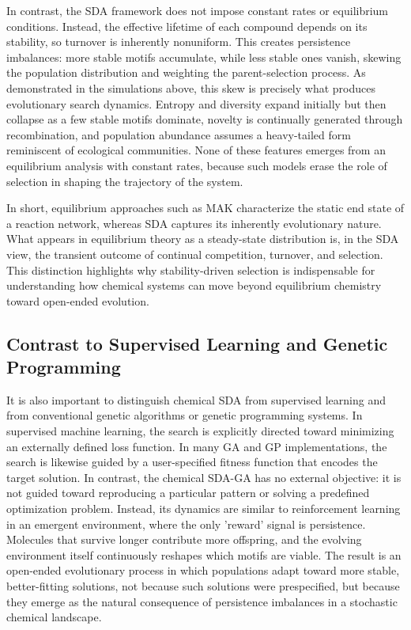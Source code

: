 \documentclass[life,article,submit,pdftex,moreauthors]{Definitions/mdpi}
\begin{document}
In contrast, the SDA framework does not impose constant rates or equilibrium conditions. Instead, the effective lifetime of each compound depends on its stability, so turnover is inherently nonuniform. This creates persistence imbalances: more stable motifs accumulate, while less stable ones vanish, skewing the population distribution and weighting the parent-selection process. As demonstrated in the simulations above, this skew is precisely what produces evolutionary search dynamics. Entropy and diversity expand initially but then collapse as a few stable motifs dominate, novelty is continually generated through recombination, and population abundance assumes a heavy-tailed form reminiscent of ecological communities. None of these features emerges from an equilibrium analysis with constant rates, because such models erase the role of selection in shaping the trajectory of the system.

In short, equilibrium approaches such as MAK characterize the static end state of a reaction network, whereas SDA captures its inherently evolutionary nature. What appears in equilibrium theory as a steady-state distribution is, in the SDA view, the transient outcome of continual competition, turnover, and selection. This distinction highlights why stability-driven selection is indispensable for understanding how chemical systems can move beyond equilibrium chemistry toward open-ended evolution.


\subsection{Contrast to Supervised Learning and Genetic Programming}  

It is also important to distinguish chemical SDA from supervised learning and from conventional genetic algorithms or genetic programming systems. In supervised machine learning, the search is explicitly directed toward minimizing an externally defined loss function. In many GA and GP implementations, the search is likewise guided by a user-specified fitness function that encodes the target solution. In contrast, the chemical SDA-GA has no external objective: it is not guided toward reproducing a particular pattern or solving a predefined optimization problem. Instead, its dynamics are similar to reinforcement learning in an emergent environment, where the only 'reward' signal is persistence. Molecules that survive longer contribute more offspring, and the evolving environment itself continuously reshapes which motifs are viable. The result is an open-ended evolutionary process in which populations adapt toward more stable, better-fitting solutions, not because such solutions were prespecified, but because they emerge as the natural consequence of persistence imbalances in a stochastic chemical landscape.
\end{document}

